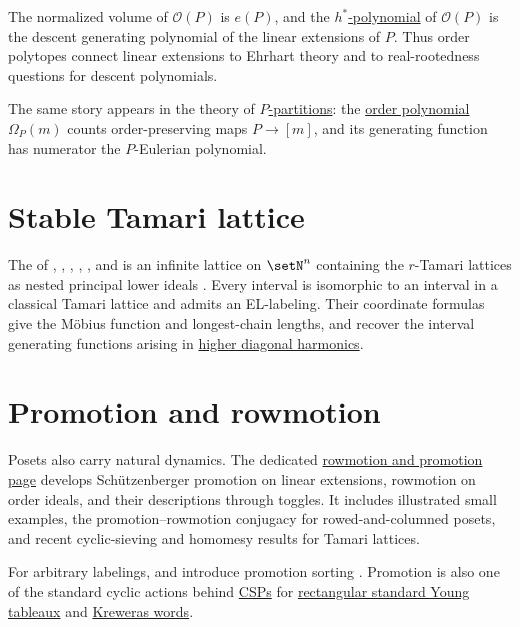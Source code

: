 The normalized volume of $\mathcal{O}(P)$ is $e(P)$, and the
\hyperref[ehrhart]{$h^*$-polynomial} of $\mathcal{O}(P)$ is the descent
generating polynomial of the linear extensions of $P$.  Thus order polytopes
connect linear extensions to Ehrhart theory and to real-rootedness questions
for descent polynomials.

The same story appears in the theory of
\hyperref[pPartition]{$P$-partitions}: the
\hyperref[orderPolynomials]{order polynomial} $\Omega_P(m)$ counts
order-preserving maps $P\to [m]$, and its generating function has numerator
the $P$-Eulerian polynomial.

\section[posetStableTamari]{Stable Tamari lattice}

The \label{stableTamariLattice} of
, , ,
, , and 
is an infinite lattice on $\setN^n$ containing the $r$-Tamari lattices as
nested principal lower ideals \cite{ChauDaughertyGrateHaimanMoriPun2026x}.
Every interval is isomorphic to an interval in a classical Tamari lattice
and admits an EL-labeling. Their coordinate formulas give the Möbius
function and longest-chain lengths, and recover the interval generating
functions arising in \hyperref[diagonalHarmonics]{higher diagonal harmonics}.

\section[posetDynamics]{Promotion and rowmotion}

Posets also carry natural dynamics.  The dedicated
\hyperref[rowmotionPromotion]{rowmotion and promotion page} develops
Schützenberger promotion on linear extensions, rowmotion on order ideals, and
their descriptions through toggles.  It includes illustrated small examples,
the promotion--rowmotion conjugacy for rowed-and-columned posets, and recent
cyclic-sieving and homomesy results for Tamari lattices.

For arbitrary labelings,  and 
introduce promotion sorting \cite{DefantKravitz2022}.  Promotion is also one
of the standard cyclic actions behind \hyperref[cyclicSieving]{CSPs} for
\hyperref[cspRectangularSYT]{rectangular standard Young tableaux} and
\hyperref[cspKrewerasWords]{Kreweras words}.

